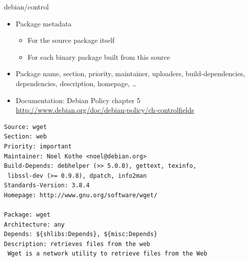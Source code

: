 \documentclass[10pt,final]{beamer}
\begin{document}
\begin{frame}[fragile]{debian/control}
  \hbr
  \begin{itemize}
  \item Package metadata
    \begin{itemize}
    \item For the source package itself
    \item For each binary package built from this source
    \end{itemize}
    \hbr
  \item Package name, section, priority, maintainer, uploaders,
    build-dependencies, dependencies, description, homepage, \ldots \hbr
  \item Documentation: Debian Policy chapter 5\\
    \url{http://www.debian.org/doc/debian-policy/ch-controlfields}
  \end{itemize}
  \seprule
\begin{lstlisting}[basicstyle=\ttfamily\footnotesize]
Source: wget
Section: web
Priority: important
Maintainer: Noel Kothe <noel@debian.org>
Build-Depends: debhelper (>> 5.0.0), gettext, texinfo,
 libssl-dev (>= 0.9.8), dpatch, info2man
Standards-Version: 3.8.4
Homepage: http://www.gnu.org/software/wget/

Package: wget
Architecture: any
Depends: ${shlibs:Depends}, ${misc:Depends}
Description: retrieves files from the web
 Wget is a network utility to retrieve files from the Web
\end{lstlisting}
\end{frame}
\end{document}
